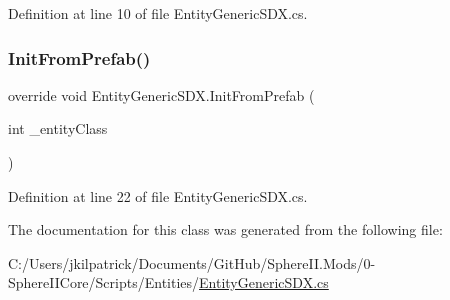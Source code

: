Definition at line 10 of file Entity\+Generic\+S\+D\+X.\+cs.

\mbox{\label{class_entity_generic_s_d_x_ae8b8dcd1b303f606cc1c997b47583d9a}} 
\subsubsection{\texorpdfstring{InitFromPrefab()}{InitFromPrefab()}}
{\footnotesize\ttfamily override void Entity\+Generic\+S\+D\+X.\+Init\+From\+Prefab (\begin{DoxyParamCaption}\item[{int}]{\+\_\+entity\+Class }\end{DoxyParamCaption})}



Definition at line 22 of file Entity\+Generic\+S\+D\+X.\+cs.



The documentation for this class was generated from the following file\+:\begin{DoxyCompactItemize}
\item 
C\+:/\+Users/jkilpatrick/\+Documents/\+Git\+Hub/\+Sphere\+I\+I.\+Mods/0-\/\+Sphere\+I\+I\+Core/\+Scripts/\+Entities/\mbox{\hyperlink{_entity_generic_s_d_x_8cs}{Entity\+Generic\+S\+D\+X.\+cs}}\end{DoxyCompactItemize}
